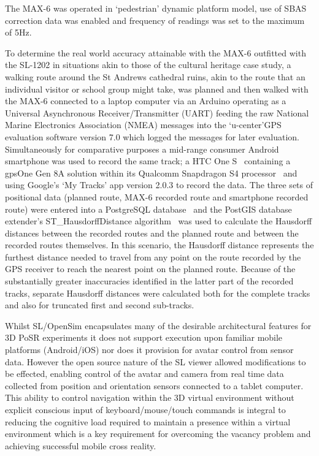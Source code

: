 The MAX-6 was operated in `pedestrian' dynamic platform model, use of SBAS correction data was enabled and frequency of readings was set to the maximum of 5Hz.

To determine the real world accuracy attainable with the MAX-6 outfitted with the SL-1202 in situations akin to those of the cultural heritage case study, a walking route around the St Andrews cathedral ruins, akin to the route that an individual visitor or school group might take, was planned and then walked with the MAX-6 connected to a laptop computer via an Arduino operating as a Universal Asynchronous Receiver/Transmitter (UART) feeding the raw National Marine Electronics Association (NMEA) messages into the `u-center'GPS evaluation software version 7.0 which logged the messages for later evaluation. Simultaneously for comparative purposes a mid-range consumer Android smartphone was used to record the same track; a HTC One S~\cite{HTCCorporation2013} containing a gpsOne Gen 8A solution within its Qualcomm Snapdragon S4 processor~\cite{QualcommIncorporated2013} and using Google's `My Tracks' app version 2.0.3 to record the data. The three sets of positional data (planned route, MAX-6 recorded route and smartphone recorded route) were entered into a PostgreSQL database~\cite{Daviesc,Daviesb} and the PostGIS database extender's ST\_HausdorffDistance algorithm~\cite{PostGIS} was used to calculate the Hausdorff distances between the recorded routes and the planned route and between the recorded routes themselves. In this scenario, the Hausdorff distance represents the furthest distance needed to travel from any point on the route recorded by the GPS receiver to reach the nearest point on the planned route. Because of the substantially greater inaccuracies identified in the latter part of the recorded tracks, separate Hausdorff distances were calculated both for the complete tracks and also for truncated first and second sub-tracks.

Whilst SL/OpenSim encapsulates many of the desirable architectural features for 3D PoSR experiments it does not support execution upon familiar mobile platforms (Android/iOS) nor does it provision for avatar control from sensor data. However the open source nature of the SL viewer allowed modifications to be effected, enabling control of the avatar and camera from real time data collected from position and orientation sensors connected to a tablet computer. This ability to control navigation within the 3D virtual environment without explicit conscious input of keyboard/mouse/touch commands is integral to reducing the cognitive load required to maintain a presence within a virtual environment which is a key requirement for overcoming the vacancy problem and achieving successful mobile cross reality.

